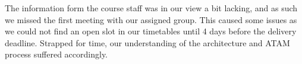 The information form the course staff was in our view a bit lacking, and as such
we missed the first meeting with our assigned group.  This caused some issues
as we could not find an open slot in our timetables until 4 days before the
delivery deadline.  Strapped for time, our understanding of the architecture
and ATAM process suffered accordingly.

